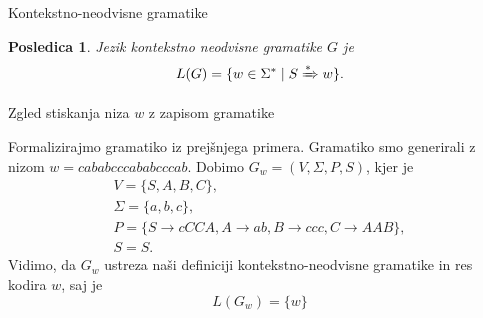 \documentclass{beamer}
\theoremstyle{definition} %
\theoremstyle{plain} %
\newtheorem{posledica}[definicija]{Posledica}
\begin{document}
\begin{frame}{Kontekstno-neodvisne gramatike}
    
    \begin{posledica}
    
        Jezik kontekstno neodvisne gramatike $ G $ je
        \[
            L(G) = \{ w \in \Sigma^* \mid S \xRightarrow{*} w \}.
        \]
    
    \end{posledica}

\end{frame}

\begin{frame}{Zgled stiskanja niza $ w $ z zapisom gramatike}
    
    Formalizirajmo gramatiko iz prejšnjega primera. Gramatiko smo generirali z nizom
    $ w = cababcccababcccab $.
    \pause
    Dobimo $ G_w = ( V, \Sigma, P, S ) $, kjer je 
    \begin{gather*}
        V = \{ S, A, B, C \}, \\
        \Sigma = \{ a, b, c \}, \\
        P = \{ S  \rightarrow  cCCA, A  \rightarrow  ab, B  
        \rightarrow  ccc, C  \rightarrow  AAB \}, \\
        S = S.
    \end{gather*}
    \pause
    Vidimo, da $ G_w $ ustreza naši definiciji kontekstno-neodvisne gramatike
    in res kodira $ w $, saj je 
    \[
        L(G_w) = \{w\}
    \]

\end{frame}
\end{document}
